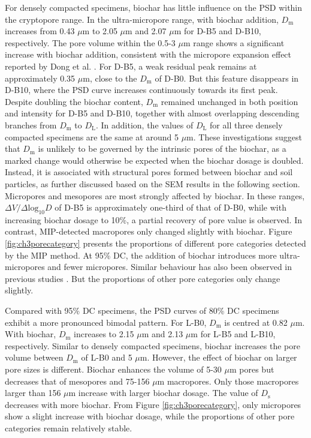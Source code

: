 For densely compacted specimens, biochar has little influence on the \ac{PSD} within the cryptopore range. In the ultra-micropore range, with biochar addition, $D_{\mathrm{m}}$ increases from 0.43 $\mu$m to 2.05 $\mu$m and 2.07 $\mu$m for D-B5 and D-B10, respectively. The pore volume within the 0.5-3 $\mu$m range shows a significant increase with biochar addition, consistent with the micropore expansion effect reported by Dong et al. \parencite*{dongMicrostructuralInvestigationUnsaturated2024}. For D-B5, a weak residual peak remains at approximately 0.35 $\mu$m, close to the $D_{\mathrm{m}}$ of D-B0. But this feature disappears in D-B10, where the PSD curve increases continuously towards its first peak. Despite doubling the biochar content, $D_{\mathrm{m}}$ remained unchanged in both position and intensity for D-B5 and D-B10, together with almost overlapping descending branches from $D_{\mathrm{m}}$ to $D_{\mathrm{L}}$. In addition, the values of $D_{\mathrm{L}}$ for all three densely compacted specimens are the same at around 5 $\mu$m. These investigations suggest that $D_{\mathrm{m}}$ is unlikely to be governed by the intrinsic pores of the biochar, as a marked change would otherwise be expected when the biochar dosage is doubled. Instead, it is associated with structural pores formed between biochar and soil particles, as further discussed based on the \ac{SEM} results in the following section. Micropores and mesopores are most strongly affected by biochar. In these ranges, $\Delta V/\Delta \mathrm{log}_{10}D$ of D-B5 is approximately one-third of that of D-B0, while with increasing biochar dosage to 10\%, a partial recovery of pore value is observed. In contrast, \ac{MIP}-detected macropores only changed slightly with biochar. Figure \ref{fig:ch3porecategory} presents the proportions of different pore categories detected by the \ac{MIP} method. At 95\% \ac{DC}, the addition of biochar introduces more ultra-micropores and fewer micropores. Similar behaviour has also been observed in previous studies \parencite{yangPyrolysisTemperatureAffects2021, ngEffectsSoilPlant2022, yiEffectsFirwoodBiochar2024}. But the proportions of other pore categories only change slightly.\par
Compared with 95\% \ac{DC} specimens, the \ac{PSD} curves of 80\% \ac{DC} specimens exhibit a more pronounced bimodal pattern. For L-B0, $D_{\mathrm{m}}$ is centred at 0.82 $\mu$m. With biochar, $D_{\mathrm{m}}$ increases to 2.15 $\mu$m and 2.13 $\mu$m for L-B5 and L-B10, respectively. Similar to densely compacted specimens, biochar increases the pore volume between $D_{\mathrm{m}}$ of L-B0 and 5 $\mu$m. However, the effect of biochar on larger pore sizes is different. Biochar enhances the volume of 5-30 $\mu$m pores but decreases that of mesopores and 75-156 $\mu$m macropores. Only those macropores larger than 156 $\mu$m increase with larger biochar dosage. The value of $D_{\mathrm{s}}$ decreases with more biochar. From Figure \ref{fig:ch3porecategory}, only micropores show a slight increase with biochar dosage, while the proportions of other pore categories remain relatively stable.\par
